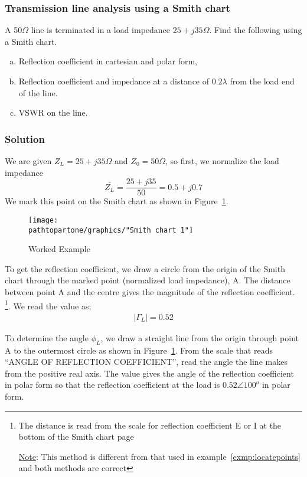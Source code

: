 \begin{exmp}
\subsubsection*{Transmission line analysis using a Smith chart}
A 50$\Omega$ line is terminated in a load impedance $25+j35\Omega$. Find the following using a Smith chart.
\begin{enumerate}[(a)]
\item Reflection coefficient in cartesian and polar form,
\item Reflection coefficient and impedance at a distance of $0.2\lambda$ from the load end of the line.
\item VSWR on the line.
\end{enumerate}

\subsubsection*{Solution}
We are given $Z_{L}=25+j35\varOmega$ and $Z_{0}=50\varOmega$, so first, we normalize the load impedance
\begin{dmath*}
\bar{Z_{L}}=\frac{25+j35}{50}=0.5+j0.7
\end{dmath*}
We mark this point on the Smith chart as shown in Figure~\ref{fig:workedexample2}.
\begin{figure}[h]
\centering
\texttt{[image: \\pathtopartone/graphics/"Smith chart 1"]}
\caption{Worked Example}
\label{fig:workedexample2}
\end{figure}

To get the reflection coefficient, we draw a circle from the origin of the Smith chart through the marked point (normalized load impedance), A. The distance between point A and the centre gives the magnitude of the reflection coefficient. \footnote{
The distance is read from the scale for reflection coefficient E or I at the bottom of the Smith chart page

\underline{Note}: This method is different from that used in example~\ref{exmp:locatepoints} and both methods are correct
}. We read the value as;
\begin{align*}
|\Gamma_{L}| = 0.52
\end{align*}

To determine the angle $\phi_{L}$, we draw a straight line from the origin through point A to the outermost circle as shown in Figure~\ref{fig:workedexample2}. From the scale that reads \textquotedblleft ANGLE OF REFLECTION COEFFICIENT\textquotedblright, read the angle the line makes from the positive real axis. The value gives the angle of the reflection coefficient in polar form so that the reflection coefficient at the load is $0.52\angle100^o$ in polar form.


\end{exmp}
